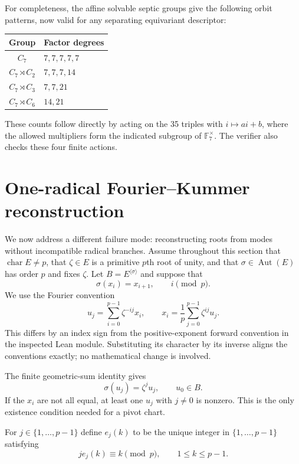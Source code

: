 \documentclass[11pt,a4paper]{article}
\theoremstyle{definition}
\theoremstyle{remark}
\newcommand{\F}{\mathbb F}
\newcommand{\charac}{\operatorname{char}}
\begin{document}
For completeness, the affine solvable septic groups give the following
orbit patterns, now valid for any separating equivariant descriptor:
\begin{center}
\begin{tabular}{@{}cl@{}}
\toprule
Group & Factor degrees\\
\midrule
$C_7$ & $7,7,7,7,7$\\
$C_7\rtimes C_2$ & $7,7,7,14$\\
$C_7\rtimes C_3$ & $7,7,21$\\
$C_7\rtimes C_6$ & $14,21$\\
\bottomrule
\end{tabular}
\end{center}
These counts follow directly by acting on the 35 triples with
$i\mapsto ai+b$, where the allowed multipliers form the indicated subgroup
of $\F_7^\times$. The verifier also checks these four finite actions.

\section{One-radical Fourier--Kummer reconstruction}
\label{sec:atlas}

We now address a different failure mode: reconstructing roots from modes
without incompatible radical branches. Assume throughout this section that
$\charac E\neq p$, that $\zeta\in E$ is a primitive $p$th root of unity,
and that $\sigma\in\operatorname{Aut}(E)$ has order $p$ and fixes $\zeta$.
Let $B=E^{\langle\sigma\rangle}$ and suppose that
\[
 \sigma(x_i)=x_{i+1},\qquad i\pmod p.
\]
We use the Fourier convention
\begin{equation}
 u_j=\sum_{i=0}^{p-1}\zeta^{-ij}x_i,
 \qquad
 x_i=\frac1p\sum_{j=0}^{p-1}\zeta^{ij}u_j.
 \label{eq:fourier}
\end{equation}
This differs by an index sign from the positive-exponent forward convention
in the inspected Lean module. Substituting its character by its inverse
aligns the conventions exactly; no mathematical change is involved.

The finite geometric-sum identity gives
\[
 \sigma(u_j)=\zeta^j u_j,
 \qquad u_0\in B.
\]
If the $x_i$ are not all equal, at least one $u_j$ with $j\neq0$ is nonzero.
This is the only existence condition needed for a pivot chart.

For $j\in\{1,\ldots,p-1\}$ define $e_j(k)$ to be the unique integer in
$\{1,\ldots,p-1\}$ satisfying
\[
 j e_j(k)\equiv k\pmod p,\qquad 1\leq k\leq p-1.
\]
\end{document}
